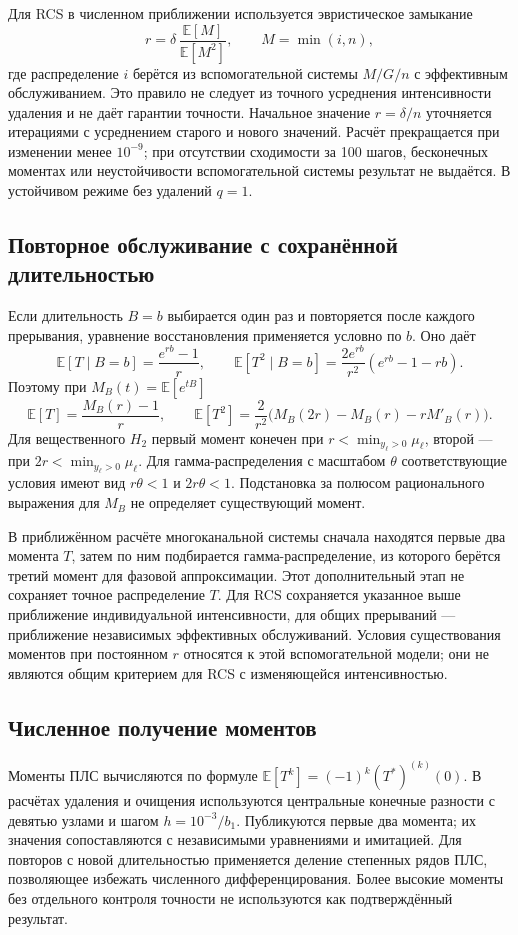 Для RCS в численном приближении используется эвристическое замыкание
\[
r=\delta\,\frac{\mathbb E[M]}{\mathbb E[M^2]},\qquad M=\min(i,n),
\]
где распределение \(i\) берётся из вспомогательной системы \(M/G/n\) с эффективным обслуживанием. Это правило не следует из точного усреднения интенсивности удаления и не даёт гарантии точности. Начальное значение \(r=\delta/n\) уточняется итерациями с усреднением старого и нового значений. Расчёт прекращается при изменении менее \(10^{-9}\); при отсутствии сходимости за 100 шагов, бесконечных моментах или неустойчивости вспомогательной системы результат не выдаётся. В устойчивом режиме без удалений \(q=1\).

\subsection{Повторное обслуживание с сохранённой длительностью}
Если длительность \(B=b\) выбирается один раз и повторяется после каждого прерывания, уравнение восстановления применяется условно по \(b\). Оно даёт
\[
\mathbb E[T\mid B=b]=\frac{e^{rb}-1}{r},\qquad
\mathbb E[T^2\mid B=b]=\frac{2e^{rb}}{r^2}(e^{rb}-1-rb).
\]
Поэтому при \(M_B(t)=\mathbb E[e^{tB}]\)
\[
\mathbb E[T]=\frac{M_B(r)-1}{r},\qquad
\mathbb E[T^2]=\frac{2}{r^2}\bigl(M_B(2r)-M_B(r)-rM'_B(r)\bigr).
\]
Для вещественного \(H_2\) первый момент конечен при \(r<\min_{y_\ell>0}\mu_\ell\), второй --- при \(2r<\min_{y_\ell>0}\mu_\ell\). Для гамма-распределения с масштабом \(\theta\) соответствующие условия имеют вид \(r\theta<1\) и \(2r\theta<1\). Подстановка за полюсом рационального выражения для \(M_B\) не определяет существующий момент.

В приближённом расчёте многоканальной системы сначала находятся первые два момента \(T\), затем по ним подбирается гамма-распределение, из которого берётся третий момент для фазовой аппроксимации. Этот дополнительный этап не сохраняет точное распределение \(T\). Для RCS сохраняется указанное выше приближение индивидуальной интенсивности, для общих прерываний --- приближение независимых эффективных обслуживаний. Условия существования моментов при постоянном \(r\) относятся к этой вспомогательной модели; они не являются общим критерием для RCS с изменяющейся интенсивностью.

\subsection{Численное получение моментов}
Моменты ПЛС вычисляются по формуле \(\mathbb E[T^k]=(-1)^k(T^*)^{(k)}(0)\). В расчётах удаления и очищения используются центральные конечные разности с девятью узлами и шагом \(h=10^{-3}/b_1\). Публикуются первые два момента; их значения сопоставляются с независимыми уравнениями и имитацией. Для повторов с новой длительностью применяется деление степенных рядов ПЛС, позволяющее избежать численного дифференцирования. Более высокие моменты без отдельного контроля точности не используются как подтверждённый результат.

